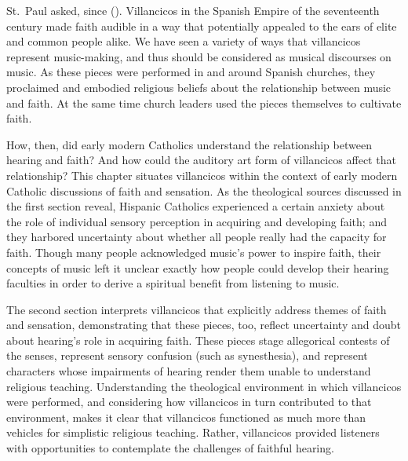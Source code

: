 

\label{ch:faith-hearing}

 St.\ Paul asked, since  ().
Villancicos in the Spanish Empire of the seventeenth century made faith audible in a way that potentially appealed to the ears of elite and common people alike.
We have seen a variety of ways that villancicos represent music-making, and thus should be considered as musical discourses on music.
As these pieces were performed in and around Spanish churches, they proclaimed and embodied religious beliefs about the relationship between music and faith.
At the same time church leaders used the pieces themselves to cultivate faith.

How, then, did early modern Catholics understand the relationship between hearing and faith?
And how could the auditory art form of villancicos affect that relationship?
This chapter situates villancicos within the context of early modern Catholic discussions of faith and sensation.
As the theological sources discussed in the first section reveal, Hispanic Catholics experienced a certain anxiety about the role of individual sensory perception in acquiring and developing faith; and they harbored uncertainty about whether all people really had the capacity for faith.
Though many people acknowledged music's power to inspire faith, their concepts of music left it unclear exactly how people could develop their hearing faculties in order to derive a spiritual benefit from listening to music.

The second section interprets villancicos that explicitly address themes of faith and sensation, demonstrating that these pieces, too, reflect uncertainty and doubt about hearing's role in acquiring faith.
These pieces stage allegorical contests of the senses, represent sensory confusion (such as synesthesia), and represent characters whose impairments of hearing render them unable to understand religious teaching.
Understanding the theological environment in which villancicos were performed, and considering how villancicos in turn contributed to that environment, makes it clear that villancicos functioned as much more than vehicles for simplistic religious teaching.
Rather, villancicos provided listeners with opportunities to contemplate the challenges of faithful hearing.

